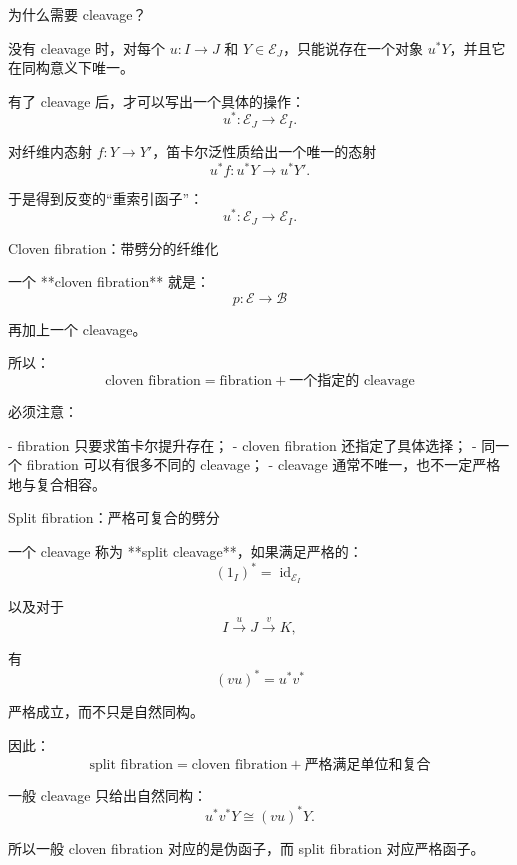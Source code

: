 \documentclass{beamer}
\begin{document}
\begin{frame}[fragile]{为什么需要 cleavage？}
\begin{markdown}
没有 cleavage 时，对每个 $u:I\to J$ 和 $Y\in\mathcal E_J$，只能说存在一个对象 $u^*Y$，并且它在同构意义下唯一。

有了 cleavage 后，才可以写出一个具体的操作：
$$
u^*:\mathcal E_J\to\mathcal E_I.
$$

对纤维内态射 $f:Y\to Y'$，笛卡尔泛性质给出一个唯一的态射
$$
u^*f:u^*Y\to u^*Y'.
$$

于是得到反变的“重索引函子”：
$$
u^*:\mathcal E_J\to\mathcal E_I.
$$
\end{markdown}
\end{frame}

\begin{frame}[fragile]{Cloven fibration：带劈分的纤维化}
\begin{markdown}
一个 **cloven fibration** 就是：
$$
p:\mathcal E\to\mathcal B
$$

再加上一个 cleavage。

所以：
$$
\boxed{\text{cloven fibration} = \text{fibration} + \text{一个指定的 cleavage}}
$$

必须注意：

- fibration 只要求笛卡尔提升存在；
- cloven fibration 还指定了具体选择；
- 同一个 fibration 可以有很多不同的 cleavage；
- cleavage 通常不唯一，也不一定严格地与复合相容。
\end{markdown}
\end{frame}

\begin{frame}[fragile]{Split fibration：严格可复合的劈分}
\begin{markdown}
一个 cleavage 称为 **split cleavage**，如果满足严格的：
$$
(1_I)^*=\operatorname{id}_{\mathcal E_I}
$$

以及对于
$$
I\xrightarrow{u}J\xrightarrow{v}K,
$$

有
$$
(vu)^*=u^*v^*
$$

严格成立，而不只是自然同构。

因此：
$$
\boxed{\text{split fibration} = \text{cloven fibration} + \text{严格满足单位和复合}}
$$

一般 cleavage 只给出自然同构：
$$
u^*v^*Y\cong (vu)^*Y.
$$

所以一般 cloven fibration 对应的是伪函子，而 split fibration 对应严格函子。
\end{markdown}
\end{frame}
\end{document}
